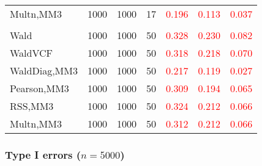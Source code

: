 \documentclass[
]{article}
\begin{document}
\begin{table}[H]
{\begin{tabular}[t]{lrrrrrr}
\hspace{1em}Multn,MM3 & 1000 & 1000 & 17 & \textcolor{red}{0.196} & \textcolor{red}{0.113} & \textcolor{red}{0.037}\\
\addlinespace[0.3em]
\multicolumn{7}{l}{\textbf{3F 15V}}\\
\hspace{1em}Wald & 1000 & 1000 & 50 & \textcolor{red}{0.328} & \textcolor{red}{0.230} & \textcolor{red}{0.082}\\
\hspace{1em}WaldVCF & 1000 & 1000 & 50 & \textcolor{red}{0.318} & \textcolor{red}{0.218} & \textcolor{red}{0.070}\\
\hspace{1em}WaldDiag,MM3 & 1000 & 1000 & 50 & \textcolor{red}{0.217} & \textcolor{red}{0.119} & \textcolor{red}{0.027}\\
\hspace{1em}Pearson,MM3 & 1000 & 1000 & 50 & \textcolor{red}{0.309} & \textcolor{red}{0.194} & \textcolor{red}{0.065}\\
\hspace{1em}RSS,MM3 & 1000 & 1000 & 50 & \textcolor{red}{0.324} & \textcolor{red}{0.212} & \textcolor{red}{0.066}\\
\hspace{1em}Multn,MM3 & 1000 & 1000 & 50 & \textcolor{red}{0.312} & \textcolor{red}{0.212} & \textcolor{red}{0.066}\\
\bottomrule
\end{tabular}}
\endgroup{}
\end{table}

\subsubsection{\texorpdfstring{Type I errors
(\(n=5000\))}{Type I errors (n=5000)}}\label{type-i-errors-n5000-1}
\end{document}
